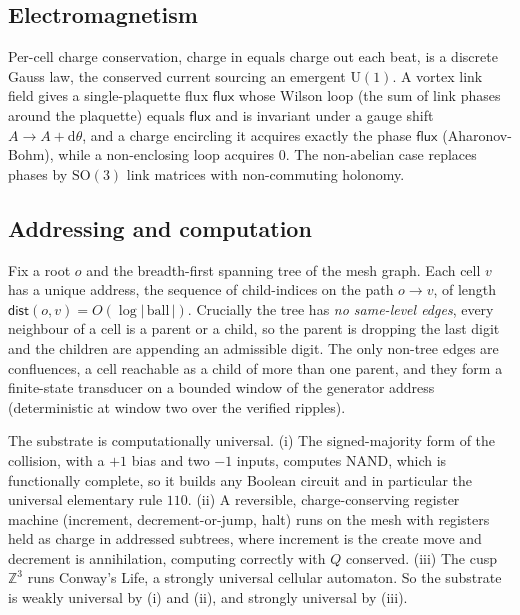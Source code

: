 \subsection{Electromagnetism}

\begin{result}
Per-cell charge conservation, charge in equals charge out each beat, is a discrete Gauss law, the conserved
current sourcing an emergent $\mathrm{U}(1)$. A vortex link field gives a single-plaquette flux $\mathsf{flux}$
whose Wilson loop (the sum of link phases around the plaquette) equals $\mathsf{flux}$ and is invariant under a
gauge shift $A \to A + \mathrm{d}\theta$, and a charge encircling it acquires exactly the phase $\mathsf{flux}$
(Aharonov-Bohm), while a non-enclosing loop acquires $0$. The non-abelian case replaces phases by $\mathrm{SO}(3)$
link matrices with non-commuting holonomy.
\end{result}

\subsection{Addressing and computation}

\begin{proposition}
Fix a root $o$ and the breadth-first spanning tree of the mesh graph. Each cell $v$ has a unique address, the
sequence of child-indices on the path $o \to v$, of length $\mathsf{dist}(o, v) = O(\log |\,\text{ball}\,|)$.
Crucially the tree has \emph{no same-level edges}, every neighbour of a cell is a parent or a child, so the parent
is dropping the last digit and the children are appending an admissible digit. The only non-tree edges are
confluences, a cell reachable as a child of more than one parent, and they form a finite-state transducer on a
bounded window of the generator address (deterministic at window two over the verified ripples).
\end{proposition}

\begin{result}[Universality]
The substrate is computationally universal. (i) The signed-majority form of the collision, with a $+1$ bias and
two $-1$ inputs, computes $\mathrm{NAND}$, which is functionally complete, so it builds any Boolean circuit and in
particular the universal elementary rule $110$. (ii) A reversible, charge-conserving register machine
(increment, decrement-or-jump, halt) runs on the mesh with registers held as charge in addressed subtrees, where
increment is the create move and decrement is annihilation, computing correctly with $Q$ conserved. (iii) The
cusp $\mathbb{Z}^3$ runs Conway's Life, a strongly universal cellular automaton. So the substrate is weakly
universal by (i) and (ii), and strongly universal by (iii).
\end{result}

